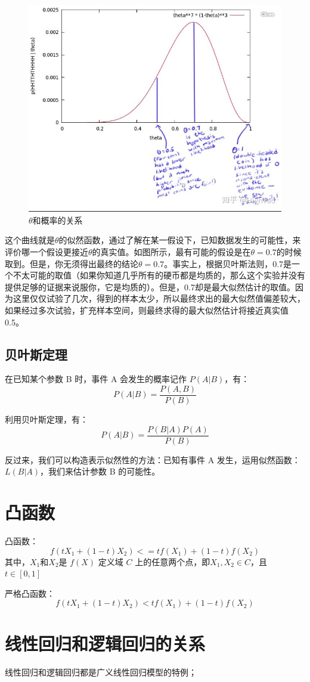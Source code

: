\documentclass[12pt]{article}
\begin{document}
\begin{figure}[H]
  \centering
  \includegraphics[width=.5\textwidth]{fig/Likelihood_theta_distribution.jpg} %
  \caption*{$\theta$和概率的关系} %
  \label{Likelihood_theta_distribution} %
\end{figure}

这个曲线就是$\theta$的似然函数，通过了解在某一假设下，已知数据发生的可能性，来评价哪一个假设更接近$\theta$的真实值。如图所示，最有可能的假设是在$\theta = 0.7$的时候取到。但是，你无须得出最终的结论$\theta = 0.7$。事实上，根据贝叶斯法则，0.7是一个不太可能的取值（如果你知道几乎所有的硬币都是均质的，那么这个实验并没有提供足够的证据来说服你，它是均质的）。但是，0.7却是最大似然估计的取值。因为这里仅仅试验了几次，得到的样本太少，所以最终求出的最大似然值偏差较大，如果经过多次试验，扩充样本空间，则最终求得的最大似然估计将接近真实值0.5。

\subsection{贝叶斯定理}
在已知某个参数 B 时，事件 A 会发生的概率记作 $P(A|B)$，有：
$$ P(A|B) = \frac{P(A,B)}{P(B)}$$

利用贝叶斯定理，有：
$$ P(A|B) = \frac{P(B|A)P(A)}{P(B)} $$

反过来，我们可以构造表示似然性的方法：已知有事件 A 发生，运用似然函数：$L(B|A)$，我们来估计参数 B 的可能性。

\section{凸函数}
凸函数：
$$f(tX_1 + (1-t)X_2) <= tf(X_1) + (1-t)f(X_2)$$
其中，$X_1$和$X_2$是 $f(X)$ 定义域 $C$ 上的任意两个点，即$X_1,X_2 \in C$，且 $t \in [0,1]$

严格凸函数：
$$f(tX_1 + (1-t)X_2) < tf(X_1) + (1-t)f(X_2)$$

\section{线性回归和逻辑回归的关系}
线性回归和逻辑回归都是广义线性回归模型的特例；
\end{document}
